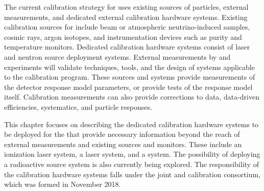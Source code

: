 The current calibration strategy for  uses existing sources of particles, external measurements, and dedicated external calibration hardware systems. Existing calibration sources for  include beam or atmospheric neutrino-induced samples, cosmic rays, argon isotopes, and instrumentation devices such as  purity and temperature monitors. Dedicated calibration hardware systems consist of laser  and neutron source deployment systems.  External measurements by  and  experiments  will validate techniques, tools, and the design of systems applicable to the  calibration program. These sources and systems provide measurements of the detector response model parameters, or provide tests of the response model itself. Calibration measurements can also provide corrections to data, data-driven efficiencies, systematics, and particle responses.


This chapter focuses on describing the dedicated calibration hardware systems to be deployed for the   that provide necessary information beyond the reach of external measurements and existing sources and monitors. These include an ionization laser system, a \phel laser system, and a  system. The possibility of deploying a radioactive source system is also currently being explored. The responsibility of the calibration hardware systems falls under the joint  and  calibration consortium, which was formed in November 2018.


